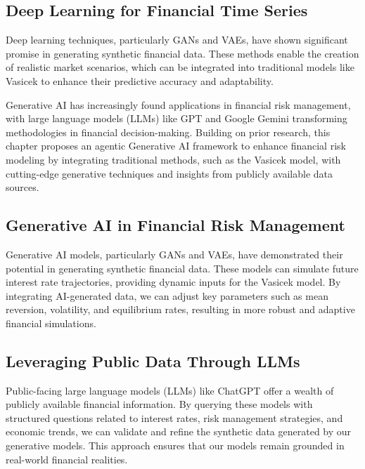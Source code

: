 \documentclass[a4paper,headinclude=on,footinclude=on,12pt,oneside]{scrbook}
\begin{document}
	\subsection{Deep Learning for Financial Time Series}
	
	Deep learning techniques, particularly GANs and VAEs, have shown significant promise in generating synthetic financial data. These methods enable the creation of realistic market scenarios, which can be integrated into traditional models like Vasicek to enhance their predictive accuracy and adaptability.
	
	
	Generative AI has increasingly found applications in financial risk management, with large language models (LLMs) like GPT and Google Gemini transforming methodologies in financial decision-making. Building on prior research, this chapter proposes an agentic Generative AI framework to enhance financial risk modeling by integrating traditional methods, such as the Vasicek model, with cutting-edge generative techniques and insights from publicly available data sources.
	
	\subsection{Generative AI in Financial Risk Management}
	
	Generative AI models, particularly GANs and VAEs, have demonstrated their potential in generating synthetic financial data. These models can simulate future interest rate trajectories, providing dynamic inputs for the Vasicek model. By integrating AI-generated data, we can adjust key parameters such as mean reversion, volatility, and equilibrium rates, resulting in more robust and adaptive financial simulations.
	
	\subsection{Leveraging Public Data Through LLMs}
	
	Public-facing large language models (LLMs) like ChatGPT offer a wealth of publicly available financial information. By querying these models with structured questions related to interest rates, risk management strategies, and economic trends, we can validate and refine the synthetic data generated by our generative models. This approach ensures that our models remain grounded in real-world financial realities.
	
\end{document}
